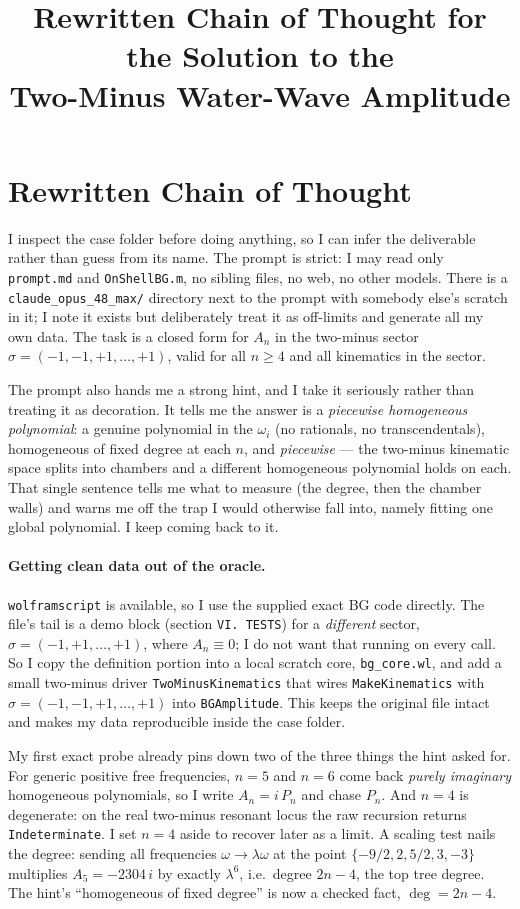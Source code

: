 \documentclass{article}
\title{Rewritten Chain of Thought for the Solution to the\\
Two-Minus Water-Wave Amplitude}
\author{}
\date{}
\begin{document}
\maketitle


\section*{Rewritten Chain of Thought}

I inspect the case folder before doing anything, so I can infer the deliverable
rather than guess from its name. The prompt is strict: I may read only
\texttt{prompt.md} and \texttt{OnShellBG.m}, no sibling files, no web, no other
models. There is a \texttt{claude\_opus\_48\_max/} directory next to the prompt
with somebody else's scratch in it; I note it exists but deliberately treat it as
off-limits and generate all my own data. The task is a closed form for $A_n$ in
the two-minus sector $\sigma=(-1,-1,+1,\dots,+1)$, valid for all $n\ge4$ and all
kinematics in the sector.

The prompt also hands me a strong hint, and I take it seriously rather than
treating it as decoration. It tells me the answer is a \emph{piecewise
homogeneous polynomial}: a genuine polynomial in the $\omega_i$ (no rationals, no
transcendentals), homogeneous of fixed degree at each $n$, and \emph{piecewise}
--- the two-minus kinematic space splits into chambers and a different
homogeneous polynomial holds on each. That single sentence tells me what to
measure (the degree, then the chamber walls) and warns me off the trap I would
otherwise fall into, namely fitting one global polynomial. I keep coming back to
it.

\paragraph{Getting clean data out of the oracle.}
\texttt{wolframscript} is available, so I use the supplied exact BG code
directly. The file's tail is a demo block (section \texttt{VI.\ TESTS}) for a
\emph{different} sector, $\sigma=(-1,+1,\dots,+1)$, where $A_n\equiv0$; I do not
want that running on every call. So I copy the definition portion into a local
scratch core, \texttt{bg\_core.wl}, and add a small two-minus driver
\texttt{TwoMinusKinematics} that wires \texttt{MakeKinematics} with
$\sigma=(-1,-1,+1,\dots,+1)$ into \texttt{BGAmplitude}. This keeps the original
file intact and makes my data reproducible inside the case folder.

My first exact probe already pins down two of the three things the hint asked
for. For generic positive free frequencies, $n=5$ and $n=6$ come back
\emph{purely imaginary} homogeneous polynomials, so I write $A_n=i\,P_n$ and chase
$P_n$. And $n=4$ is degenerate: on the real two-minus resonant locus the raw
recursion returns \texttt{Indeterminate}. I set $n=4$ aside to recover later as a
limit. A scaling test nails the degree: sending all frequencies
$\omega\to\lambda\omega$ at the point $\{-9/2,2,5/2,3,-3\}$ multiplies
$A_5=-2304\,i$ by exactly $\lambda^6$, i.e.\ degree $2n-4$, the top tree degree.
The hint's ``homogeneous of fixed degree'' is now a checked fact, $\deg=2n-4$.
\end{document}
